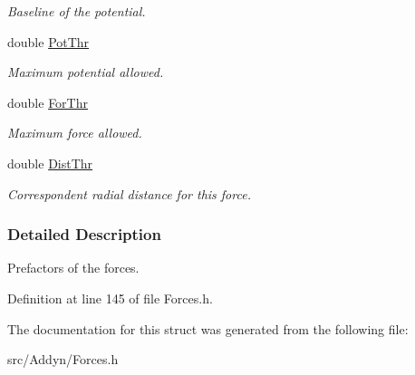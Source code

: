 \begin{DoxyCompactItemize}
\begin{DoxyCompactList}\small\item\em Baseline of the potential. \end{DoxyCompactList}\item 
double \hyperlink{structKFORCES_adf3d7e8b11ee1fa9f6b7b58141ab5112}{Pot\+Thr}\hypertarget{structKFORCES_adf3d7e8b11ee1fa9f6b7b58141ab5112}{}\label{structKFORCES_adf3d7e8b11ee1fa9f6b7b58141ab5112}

\begin{DoxyCompactList}\small\item\em Maximum potential allowed. \end{DoxyCompactList}\item 
double \hyperlink{structKFORCES_ad631a0b43047f95f5bb991f5407b813e}{For\+Thr}\hypertarget{structKFORCES_ad631a0b43047f95f5bb991f5407b813e}{}\label{structKFORCES_ad631a0b43047f95f5bb991f5407b813e}

\begin{DoxyCompactList}\small\item\em Maximum force allowed. \end{DoxyCompactList}\item 
double \hyperlink{structKFORCES_a7be87fae5fde1648d34b194775515d08}{Dist\+Thr}\hypertarget{structKFORCES_a7be87fae5fde1648d34b194775515d08}{}\label{structKFORCES_a7be87fae5fde1648d34b194775515d08}

\begin{DoxyCompactList}\small\item\em Correspondent radial distance for this force. \end{DoxyCompactList}\end{DoxyCompactItemize}


\subsubsection{Detailed Description}
Prefactors of the forces. 

Definition at line 145 of file Forces.\+h.



The documentation for this struct was generated from the following file\+:\begin{DoxyCompactItemize}
\item 
src/\+Addyn/Forces.\+h\end{DoxyCompactItemize}
